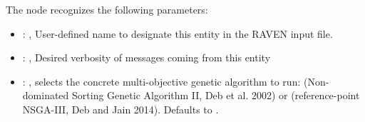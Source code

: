   The  node recognizes the following parameters:
    \begin{itemize}
      \item {}: ,
        User-defined name to designate this entity in the RAVEN input file.
      \item {}: ,
        Desired verbosity of messages coming from this entity
      \item {}: ,
        selects the concrete multi-objective genetic algorithm to run: 
        (Non-dominated Sorting Genetic Algorithm II, Deb et al. 2002) or 
        (reference-point NSGA-III, Deb and Jain 2014). Defaults to . 
  \end{itemize}

